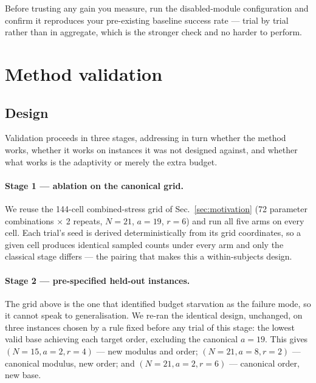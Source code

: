 \documentclass[preprint,11pt]{elsarticle}
\begin{document}
Before trusting any gain you measure, run the disabled-module
configuration and confirm it reproduces your pre-existing baseline
success rate --- trial by trial rather than in aggregate, which is the
stronger check and no harder to perform.

\section{Method validation}
\label{sec:validation}

\subsection{Design}
\label{sec:design}

Validation proceeds in three stages, addressing in turn whether the
method works, whether it works on instances it was not designed against,
and whether what works is the adaptivity or merely the extra budget.

\paragraph{Stage 1 --- ablation on the canonical grid.} We reuse the
144-cell combined-stress grid of Sec.~\ref{sec:motivation} (72 parameter
combinations $\times$ 2 repeats, $N=21$, $a=19$, $r=6$) and run all five
arms on every cell. Each trial's seed is derived deterministically from
its grid coordinates, so a given cell produces identical sampled counts
under every arm and only the classical stage differs --- the pairing that
makes this a within-subjects design.

\paragraph{Stage 2 --- pre-specified held-out instances.} The grid above
is the one that identified budget starvation as the failure mode, so it
cannot speak to generalisation. We re-ran the identical design, unchanged,
on three instances chosen by a rule fixed before any trial of this stage:
the lowest valid base achieving each target order, excluding the
canonical $a=19$. This gives $(N{=}15,a{=}2,r{=}4)$ --- new modulus and
order; $(N{=}21,a{=}8,r{=}2)$ --- canonical modulus, new order; and
$(N{=}21,a{=}2,r{=}6)$ --- canonical order, new base.
\end{document}
